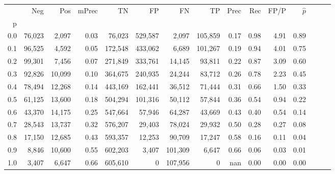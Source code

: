 \begin{tabular}{rrrrrrrrrrrrrrr}
\toprule
{} &     Neg &     Pos & mPrec &       TN &       FP &       FN &       TP &  Prec &   Rec &  FP/P & $\hat{p}$ \\
p   &         &         &       &          &          &          &          &       &       &       &           \\
\midrule
0.0 &  76,023 &   2,097 &  0.03 &   76,023 &  529,587 &    2,097 &  105,859 &  0.17 &  0.98 &  4.91 &      0.89 \\
0.1 &  96,525 &   4,592 &  0.05 &  172,548 &  433,062 &    6,689 &  101,267 &  0.19 &  0.94 &  4.01 &      0.75 \\
0.2 &  99,301 &   7,456 &  0.07 &  271,849 &  333,761 &   14,145 &   93,811 &  0.22 &  0.87 &  3.09 &      0.60 \\
0.3 &  92,826 &  10,099 &  0.10 &  364,675 &  240,935 &   24,244 &   83,712 &  0.26 &  0.78 &  2.23 &      0.45 \\
0.4 &  78,494 &  12,268 &  0.14 &  443,169 &  162,441 &   36,512 &   71,444 &  0.31 &  0.66 &  1.50 &      0.33 \\
0.5 &  61,125 &  13,600 &  0.18 &  504,294 &  101,316 &   50,112 &   57,844 &  0.36 &  0.54 &  0.94 &      0.22 \\
0.6 &  43,370 &  14,175 &  0.25 &  547,664 &   57,946 &   64,287 &   43,669 &  0.43 &  0.40 &  0.54 &      0.14 \\
0.7 &  28,543 &  13,737 &  0.32 &  576,207 &   29,403 &   78,024 &   29,932 &  0.50 &  0.28 &  0.27 &      0.08 \\
0.8 &  17,150 &  12,685 &  0.43 &  593,357 &   12,253 &   90,709 &   17,247 &  0.58 &  0.16 &  0.11 &      0.04 \\
0.9 &   8,846 &  10,600 &  0.55 &  602,203 &    3,407 &  101,309 &    6,647 &  0.66 &  0.06 &  0.03 &      0.01 \\
1.0 &   3,407 &   6,647 &  0.66 &  605,610 &        0 &  107,956 &        0 &   nan &  0.00 &  0.00 &      0.00 \\
\bottomrule
\end{tabular}
